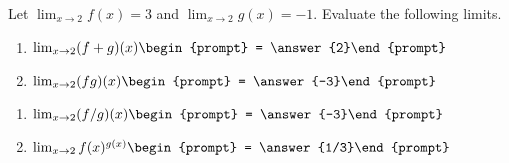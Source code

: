\documentclass{ximera}
\author{Gregory Hartman \and Matthew Carr}
\begin{document}
\begin{exercise}



Let $\lim_{x\to2} f(x) = 3$ and $\lim_{x\to2} g(x) = -1$. Evaluate the following limits.

\begin{minipage}[t]{.5\linewidth}
\begin{enumerate}
\item		$\lim_{x\to2}(f+g)(x)\begin{prompt} = \answer{2}\end{prompt}$
\item		$\lim_{x\to2}(fg)(x)\begin{prompt} = \answer{-3}\end{prompt}$
\end{enumerate}
\end{minipage}
\begin{minipage}[t]{.5\linewidth}
\begin{enumerate}\addtocounter{enumi}{2}
\item		$\lim_{x\to2}(f/g)(x)\begin{prompt} = \answer{-3}\end{prompt}$
\item		$\lim_{x\to2}f(x)^{g(x)}\begin{prompt} = \answer{1/3}\end{prompt}$
\end{enumerate}
\end{minipage}

\end{exercise}
\end{document}
